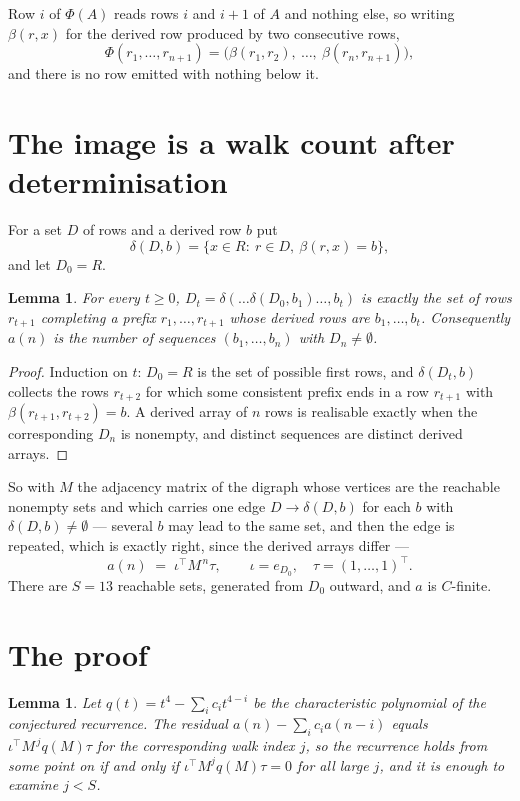 \documentclass[11pt,a4paper]{article}
\theoremstyle{plain}
\newtheorem{lemma}[theorem]{Lemma}
\theoremstyle{definition}
\begin{document}
Row $i$ of $\Phi(A)$ reads rows $i$ and $i+1$ of $A$ and nothing else, so
writing $\beta(r,x)$ for the derived row produced by two consecutive rows,
\[
\Phi(r_1,\dots,r_{n+1})=\bigl(\beta(r_1,r_2),\ \dots,\ \beta(r_n,r_{n+1})\bigr),
\]
and there is no row emitted with nothing below it.

\section{The image is a walk count after determinisation}

For a set $D$ of rows and a derived row $b$ put
\[
\delta(D,b)=\{x\in R:\ r\in D,\ \beta(r,x)=b\},
\]
and let $D_0=R$.

\begin{lemma}\label{lem:det}
For every $t\ge0$, $D_t=\delta(\dots\delta(D_0,b_1)\dots,b_t)$ is exactly the set of rows
$r_{t+1}$ completing a prefix $r_1,\dots,r_{t+1}$ whose derived rows are $b_1,\dots,b_t$.
Consequently $a(n)$ is the number of sequences $(b_1,\dots,b_n)$ with $D_n\neq\emptyset$.
\end{lemma}

\begin{proof}
Induction on $t$: $D_0=R$ is the set of possible first rows, and $\delta(D_t,b)$ collects the
rows $r_{t+2}$ for which some consistent prefix ends in a row $r_{t+1}$ with
$\beta(r_{t+1},r_{t+2})=b$. A derived array of $n$ rows is realisable exactly when the
corresponding $D_n$ is nonempty, and distinct sequences are distinct derived arrays.
\end{proof}

So with $M$ the adjacency matrix of the digraph whose vertices are the reachable nonempty sets
and which carries one edge $D\to\delta(D,b)$ for each $b$ with $\delta(D,b)\neq\emptyset$ ---
several $b$ may lead to the same set, and then the edge is repeated, which is exactly right,
since the derived arrays differ ---
\[
a(n)\;=\;\iota^{\!\top}M^{\,n}\tau,\qquad \iota=e_{D_0},\quad \tau=(1,\dots,1)^{\!\top} .
\]
There are $S=13$ reachable sets, generated from $D_0$ outward, and $a$ is $C$-finite.


\section{The proof}

\begin{lemma}\label{lem:crit}
Let $q(t)=t^{4}-\sum_i c_it^{4-i}$ be the characteristic polynomial of the
conjectured recurrence. The residual $a(n)-\sum_ic_ia(n-i)$ equals
$\iota^{\!\top}M^{\,j}q(M)\tau$ for the corresponding walk index $j$, so the recurrence
holds from some point on if and only if $\iota^{\!\top}M^{j}q(M)\tau=0$ for all large $j$,
and it is enough to examine $j<S$.
\end{lemma}
\end{document}
